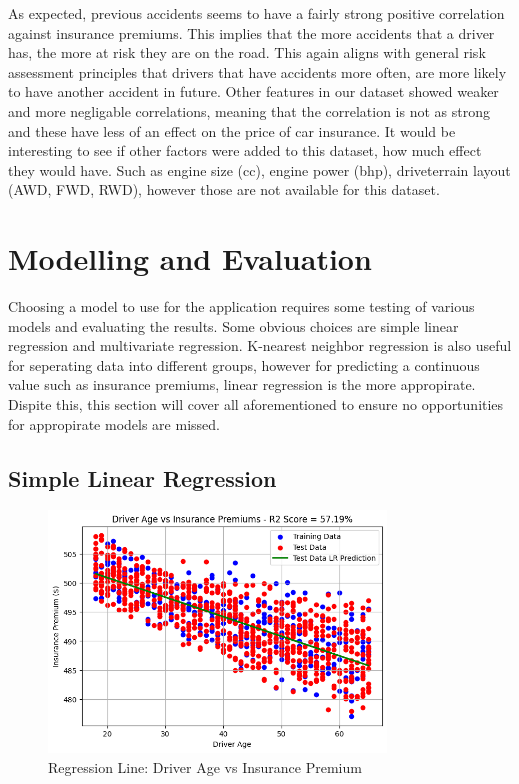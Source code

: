 \documentclass{article}
\begin{document}
As expected, previous accidents seems to have a fairly strong positive correlation against insurance premiums. This implies that the more accidents that a driver has, the more at risk they are on the road. This again aligns with general risk assessment principles that drivers that have accidents more often, are more likely to have another accident in future. Other features in our dataset showed weaker and more negligable correlations, meaning that the correlation is not as strong and these have less of an effect on the price of car insurance. It would be interesting to see if other factors were added to this dataset, how much effect they would have. Such as engine size (cc), engine power (bhp), driveterrain layout (AWD, FWD, RWD), however those are not available for this dataset.

\section{Modelling and Evaluation}

Choosing a model to use for the application requires some testing of various models and evaluating the results. Some obvious choices are simple linear regression and multivariate regression. K-nearest neighbor regression is also useful for seperating data into different groups, however for predicting a continuous value such as insurance premiums, linear regression is the more appropirate. Dispite this, this section will cover all aforementioned to ensure no opportunities for appropirate models are missed.

\subsection{Simple Linear Regression}

\begin{figure}[ht]
\centering
\includegraphics[width=0.8\textwidth]{age_insurance_LR.png}
\caption{Regression Line: Driver Age vs Insurance Premium}\label{fig:regression_age}
\end{figure}
\end{document}
